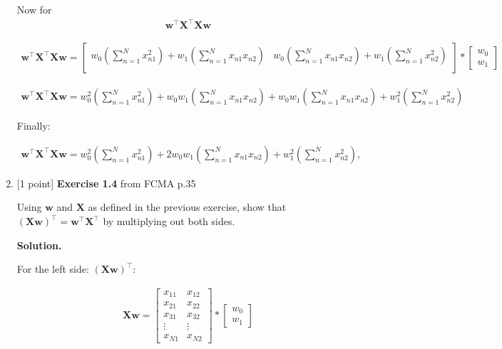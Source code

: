 \documentclass[10pt]{article}
\begin{document}
\begin{enumerate}
Now for 
\begin{eqnarray*}
\mathbf{w}^\top\mathbf{X}^\top\mathbf{X}\mathbf{w}
\end{eqnarray*}

\begin{eqnarray*}
\mathbf{w}^\top\mathbf{X}^\top\mathbf{X}\mathbf{w} =
    \begin{bmatrix}
    w_0 \left( \sum_{n=1}^N x_{n1}^2 \right) + w_1 \left( \sum_{n=1}^N x_{n1}x_{n2} \right) & w_0 \left( \sum_{n=1}^N x_{n1}x_{n2} \right) + w_1 \left( \sum_{n=1}^N x_{n2}^2 \right) \\[0.3em]
    \end{bmatrix}
* 
    \begin{bmatrix}
    w_0 \\[0.3em]
    w_1
    \end{bmatrix}
\end{eqnarray*}


\begin{eqnarray*}
\mathbf{w}^\top\mathbf{X}^\top\mathbf{X}\mathbf{w} =
w_0^2 \left( \sum_{n=1}^N x_{n1}^2 \right) + w_0 w_1 \left( \sum_{n=1}^N x_{n1}x_{n2} \right) + w_0 w_1 \left( \sum_{n=1}^N x_{n1}x_{n2} \right) + w_1^2 \left( \sum_{n=1}^N x_{n2}^2 \right)
\end{eqnarray*}

Finally: 

\begin{eqnarray*}
\mathbf{w}^\top\mathbf{X}^\top\mathbf{X}\mathbf{w} = w_0^2 \left( \sum_{n=1}^N x_{n1}^2 \right) + 2w_0w_1 \left( \sum_{n=1}^N x_{n1}x_{n2} \right) + w_1^2 \left( \sum_{n=1}^N x_{n2}^2 \right),
\end{eqnarray*}


\item \label{prob:4} [1 point]
{\bf Exercise 1.4} from FCMA p.35

Using $\mathbf{w}$ and $\mathbf{X}$ as defined in the previous exercise, show that ${(\mathbf{X}\mathbf{w})}^\top = {\mathbf{w}}^\top{\mathbf{X}}^\top$ by multiplying out both sides.

{\bf Solution.} 

For the left side: ${(\mathbf{X}\mathbf{w})}^\top$:

\begin{eqnarray*}
\mathbf{X}\mathbf{w} = 
    \begin{bmatrix}
    x_{11} & x_{12} \\[0.3em]
    x_{21} & x_{22} \\[0.3em]
    x_{31} & x_{32} \\[0.3em]
    \vdots & \vdots \\[0.3em]
    x_{N1} & x_{N2}
    \end{bmatrix}
    *
    \begin{bmatrix}
    w_0 \\[0.3em]
    w_1
    \end{bmatrix}
\end{eqnarray*}


\end{enumerate}
\end{document}
